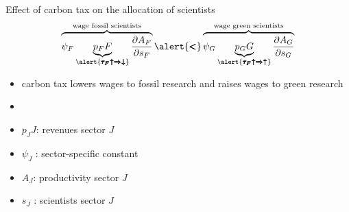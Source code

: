 \documentclass[11pt,aspectratio=169]{beamer}
\begin{document}
\addtocounter{framenumber}{-1}

\begin{frame}{Effect of carbon tax on the allocation of scientists}
\vspace{2mm}
\begin{align*}
	\overbrace{{\psi_F} \underbrace{p_F{F}}_{\alert{\pmb{\tau_F\uparrow\Rightarrow\downarrow}}}\frac{\partial A_{F}}{\partial s_{F}}}^{\text{wage fossil scientists}}\alert{\pmb{<}}\overbrace{{\psi_G} \underbrace{p_G{G}}_{\alert{\pmb{\tau_F\uparrow\Rightarrow\uparrow}}}\frac{\partial A_{G}}{\partial s_{G}}}^{\text{wage green scientists}}
\end{align*}
\normalsize
\begin{itemize}
	\item carbon tax lowers wages to fossil research and raises wages to green research
	\vspace{2mm}
	\item[]%
\end{itemize}
\small
\vspace{4mm}
\hspace{-2mm}
\begin{minipage}[t!]{0.4\textwidth}
	\vspace{0mm}
	\begin{itemize}
		\item[] $p_JJ$: revenues sector $J$
		\vspace{-2mm}
		\item[] $\psi_J$ : sector-specific constant
	\end{itemize}
\end{minipage}
\vspace{-5mm}
\begin{minipage}[t!]{0.5\textwidth}
	\vspace{0mm}
	\begin{itemize}	
		\item[] $A_J$: productivity sector $J$
		\vspace{-2mm}			
		\item[] $s_J$ : scientists sector $J$
	\end{itemize}
\end{minipage}
\end{frame}

\addtocounter{framenumber}{-1}
\end{document}
